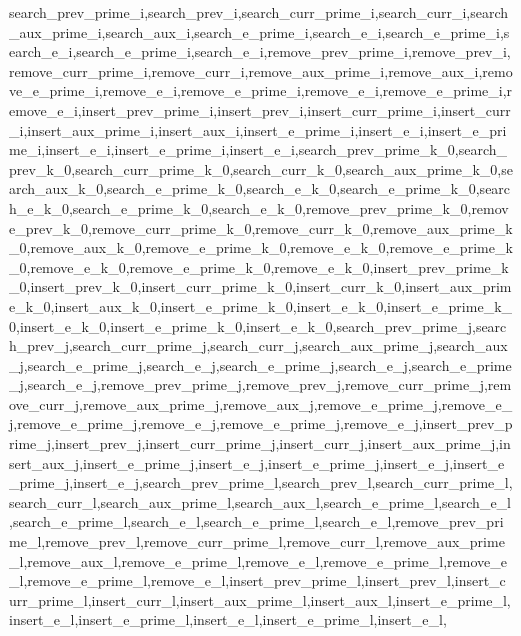     search\_prev\_prime\_i,search\_prev\_i,search\_curr\_prime\_i,search\_curr\_i,search\_aux\_prime\_i,search\_aux\_i,search\_e\_prime\_i,search\_e\_i,search\_e\_prime\_i,search\_e\_i,search\_e\_prime\_i,search\_e\_i,remove\_prev\_prime\_i,remove\_prev\_i,remove\_curr\_prime\_i,remove\_curr\_i,remove\_aux\_prime\_i,remove\_aux\_i,remove\_e\_prime\_i,remove\_e\_i,remove\_e\_prime\_i,remove\_e\_i,remove\_e\_prime\_i,remove\_e\_i,insert\_prev\_prime\_i,insert\_prev\_i,insert\_curr\_prime\_i,insert\_curr\_i,insert\_aux\_prime\_i,insert\_aux\_i,insert\_e\_prime\_i,insert\_e\_i,insert\_e\_prime\_i,insert\_e\_i,insert\_e\_prime\_i,insert\_e\_i,search\_prev\_prime\_k\_0,search\_prev\_k\_0,search\_curr\_prime\_k\_0,search\_curr\_k\_0,search\_aux\_prime\_k\_0,search\_aux\_k\_0,search\_e\_prime\_k\_0,search\_e\_k\_0,search\_e\_prime\_k\_0,search\_e\_k\_0,search\_e\_prime\_k\_0,search\_e\_k\_0,remove\_prev\_prime\_k\_0,remove\_prev\_k\_0,remove\_curr\_prime\_k\_0,remove\_curr\_k\_0,remove\_aux\_prime\_k\_0,remove\_aux\_k\_0,remove\_e\_prime\_k\_0,remove\_e\_k\_0,remove\_e\_prime\_k\_0,remove\_e\_k\_0,remove\_e\_prime\_k\_0,remove\_e\_k\_0,insert\_prev\_prime\_k\_0,insert\_prev\_k\_0,insert\_curr\_prime\_k\_0,insert\_curr\_k\_0,insert\_aux\_prime\_k\_0,insert\_aux\_k\_0,insert\_e\_prime\_k\_0,insert\_e\_k\_0,insert\_e\_prime\_k\_0,insert\_e\_k\_0,insert\_e\_prime\_k\_0,insert\_e\_k\_0,search\_prev\_prime\_j,search\_prev\_j,search\_curr\_prime\_j,search\_curr\_j,search\_aux\_prime\_j,search\_aux\_j,search\_e\_prime\_j,search\_e\_j,search\_e\_prime\_j,search\_e\_j,search\_e\_prime\_j,search\_e\_j,remove\_prev\_prime\_j,remove\_prev\_j,remove\_curr\_prime\_j,remove\_curr\_j,remove\_aux\_prime\_j,remove\_aux\_j,remove\_e\_prime\_j,remove\_e\_j,remove\_e\_prime\_j,remove\_e\_j,remove\_e\_prime\_j,remove\_e\_j,insert\_prev\_prime\_j,insert\_prev\_j,insert\_curr\_prime\_j,insert\_curr\_j,insert\_aux\_prime\_j,insert\_aux\_j,insert\_e\_prime\_j,insert\_e\_j,insert\_e\_prime\_j,insert\_e\_j,insert\_e\_prime\_j,insert\_e\_j,search\_prev\_prime\_l,search\_prev\_l,search\_curr\_prime\_l,search\_curr\_l,search\_aux\_prime\_l,search\_aux\_l,search\_e\_prime\_l,search\_e\_l,search\_e\_prime\_l,search\_e\_l,search\_e\_prime\_l,search\_e\_l,remove\_prev\_prime\_l,remove\_prev\_l,remove\_curr\_prime\_l,remove\_curr\_l,remove\_aux\_prime\_l,remove\_aux\_l,remove\_e\_prime\_l,remove\_e\_l,remove\_e\_prime\_l,remove\_e\_l,remove\_e\_prime\_l,remove\_e\_l,insert\_prev\_prime\_l,insert\_prev\_l,insert\_curr\_prime\_l,insert\_curr\_l,insert\_aux\_prime\_l,insert\_aux\_l,insert\_e\_prime\_l,insert\_e\_l,insert\_e\_prime\_l,insert\_e\_l,insert\_e\_prime\_l,insert\_e\_l,

